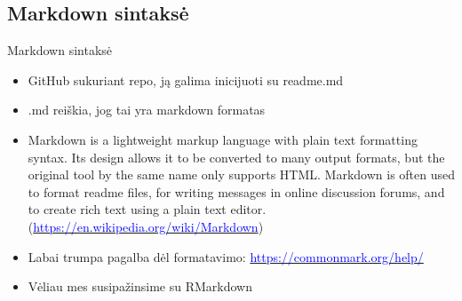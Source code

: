 \documentclass[11pt,xcolor=table]{beamer}
\begin{document}
\subsection{Markdown sintaksė}
\begin{frame}[fragile]{Markdown sintaksė}
\begin{itemize}
\item GitHub sukuriant repo, ją galima inicijuoti su readme.md
\item .md reiškia, jog tai yra markdown formatas
\item Markdown is a lightweight markup language with plain text formatting syntax. Its design allows it to be converted to many output formats, but the original tool by the same name only supports HTML. Markdown is often used to format readme files, for writing messages in online discussion forums, and to create rich text using a plain text editor. (\href{https://en.wikipedia.org/wiki/Markdown}{\textcolor{blue}{https://en.wikipedia.org/wiki/Markdown}})
\item Labai trumpa pagalba dėl formatavimo: \href{https://commonmark.org/help/}{\textcolor{blue}{https://commonmark.org/help/}}
\item Vėliau mes susipažinsime su RMarkdown
\end{itemize}
\end{frame}

\end{document}
